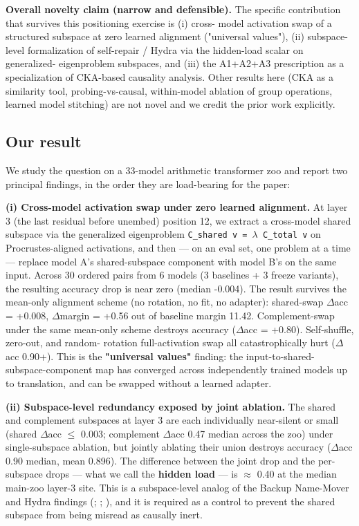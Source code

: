 \textbf{Overall novelty claim (narrow and defensible).} The specific
contribution that survives this positioning exercise is (i) cross-
model activation swap of a structured subspace at zero learned
alignment ("universal values"), (ii) subspace-level formalization of
self-repair / Hydra via the hidden-load scalar on generalized-
eigenproblem subspaces, and (iii) the A1+A2+A3 prescription as a
specialization of CKA-based causality analysis. Other results here
(CKA as a similarity tool, probing-vs-causal, within-model ablation
of group operations, learned model stitching) are not novel and we
credit the prior work explicitly.

\subsection{Our result}

We study the question on a 33-model arithmetic transformer zoo and
report two principal findings, in the order they are load-bearing
for the paper:

\textbf{(i) Cross-model activation swap under zero learned alignment.} At
layer 3 (the last residual before unembed) position 12, we extract a
cross-model shared subspace via the generalized eigenproblem
\texttt{C\_shared v = $\lambda$ C\_total v} on Procrustes-aligned activations, and
then --- on an eval set, one problem at a time --- replace model A's
shared-subspace component with model B's on the same input. Across
30 ordered pairs from 6 models (3 baselines + 3 freeze variants), the
resulting accuracy drop is near zero (median -0.004). The result
survives the mean-only alignment scheme (no rotation, no fit, no
adapter): shared-swap $\Delta$acc = +0.008, $\Delta$margin = +0.56 out of baseline
margin 11.42. Complement-swap under the same mean-only scheme
destroys accuracy ($\Delta$acc = +0.80). Self-shuffle, zero-out, and random-
rotation full-activation swap all catastrophically hurt ($\Delta$acc 0.90+).
This is the \textbf{"universal values"} finding: the input-to-shared-
subspace-component map has converged across independently trained
models up to translation, and can be swapped without a learned adapter.

\textbf{(ii) Subspace-level redundancy exposed by joint ablation.} The
shared and complement subspaces at layer 3 are each individually
near-silent or small (shared $\Delta$acc $\leq$ 0.003; complement $\Delta$acc 0.47
median across the zoo) under single-subspace ablation, but jointly
ablating their union destroys accuracy ($\Delta$acc 0.90 median, mean 0.896).
The difference between the joint drop and the per-subspace drops ---
what we call the \textbf{hidden load} --- is $\approx$ 0.40 at the median main-zoo
layer-3 site. This is a subspace-level analog of the Backup
Name-Mover and Hydra findings (\citep{wang2023iw}; \citep{mcgrath2023hydra}; \citet{rushing2024selfrepair}), and it is required as a control to prevent the shared
subspace from being misread as causally inert.

